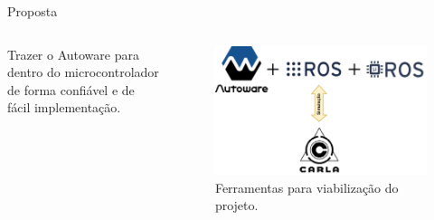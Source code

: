 \documentclass{if-beamer}
\begin{document}
\begin{frame}{Proposta}
	
	\begin{columns}
		
		\begin{column}{0.35\textwidth}
			
			\begin{block}{}
				
				Trazer o Autoware para dentro do microcontrolador de forma confiável e de fácil implementação.
				
			\end{block}
			
		\end{column}
	
\pause
		
		\begin{column}{0.7\textwidth}
			
			\begin{figure}[H]
				\centering
				\includegraphics[width=1\linewidth]{logos}
				\caption{Ferramentas para viabilização do projeto.}
				\label{fig:logos}
			\end{figure}
			
		\end{column}
		
	\end{columns}
	
\end{frame}
\end{document}
